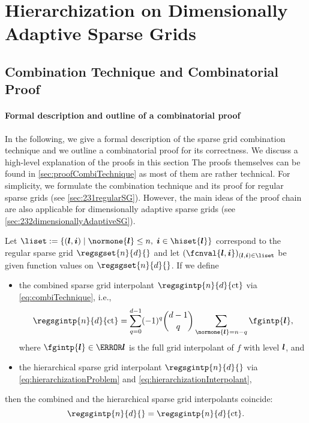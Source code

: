\section{Hierarchization on Dimensionally Adaptive Sparse Grids}
\label{sec:43dimAdaptive}

\blindtext{}



\subsection{Combination Technique and Combinatorial Proof}
\label{sec:431combiTechniqueProof}



\blindtext{}

\paragraph{Formal description and outline of a combinatorial proof}

In the following, we give a formal description of the
sparse grid combination technique and we outline a combinatorial proof
for its correctness.
We discuss a high-level explanation of the proofs in this section
The proofs themselves can be found in \cref{sec:proofCombiTechnique}
as most of them are rather technical.
For simplicity,
we formulate the combination technique and its proof for regular
sparse grids (see \cref{sec:231regularSG}).
However, the main ideas of the proof chain are also applicable
for dimensionally adaptive sparse grids
(see \cref{sec:232dimensionallyAdaptiveSG}).

\begin{theorem}
  Let $\liset := \{(\*l, \*i) \mid
  \normone{\*l} \le n,\; \*i \in \hiset{\*l}\}$
  correspond to the regular sparse grid
  $\regsgset{n}{d}{}$ and let $(\fcnval{\*l,\*i})_{(\*l,\*i) \in \liset}$
  be given function values on $\regsgset{n}{d}{}$.
  If we define
  \begin{itemize}
    \item
    the combined sparse grid interpolant $\regsgintp{n}{d}{\ct}$ via
    \eqref{eq:combiTechnique}, i.e.,
    \begin{equation}
      \regsgintp{n}{d}{\ct}
      = \sum_{q=0}^{d-1} (-1)^q \binom{d-1}{q} \sum_{\normone{\*l} = n-q}
      \fgintp{\*l},
    \end{equation}
    where $\fgintp{\*l} \in \ns{\*l}$ is the full grid interpolant
    of $f$ with level ${\boldsymbol{l}}$, and
    
    \item
    the hierarchical sparse grid interpolant $\regsgintp{n}{d}{}$
    via \eqref{eq:hierarchizationProblem} and
    \eqref{eq:hierarchizationInterpolant},
  \end{itemize}
  then the combined and the hierarchical sparse grid interpolants coincide:
  \begin{equation}
    \regsgintp{n}{d}{}
    = \regsgintp{n}{d}{\ct}.
  \end{equation}
\end{theorem}

